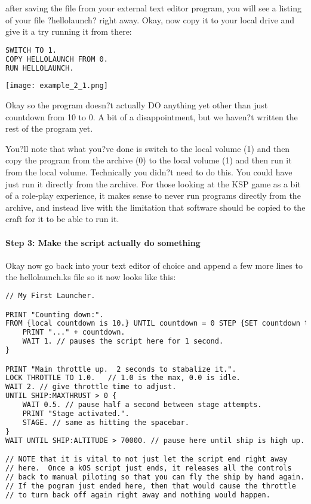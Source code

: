 after saving the file from your external text editor program, you will see a listing of your file ?hellolaunch? right away. Okay, now copy it to your local drive and give it a try running it from there:

\begin{lstlisting}[frame=single,language=XML]
SWITCH TO 1.
COPY HELLOLAUNCH FROM 0.
RUN HELLOLAUNCH.
\end{lstlisting} 

\begin{center}
\texttt{[image: example\_2\_1.png]}
\end{center}

Okay so the program doesn?t actually DO anything yet other than just countdown from 10 to 0. A bit of a disappointment, but we haven?t written the rest of the program yet.

You?ll note that what you?ve done is switch to the local volume (1) and then copy the program from the archive (0) to the local volume (1) and then run it from the local volume. Technically you didn?t need to do this. You could have just run it directly from the archive. For those looking at the KSP game as a bit of a role-play experience, it makes sense to never run programs directly from the archive, and instead live with the limitation that software should be copied to the craft for it to be able to run it.

\paragraph{Step 3: Make the script actually do something}
Okay now go back into your text editor of choice and append a few more lines to the hellolaunch.ks file so it now looks like this:

\begin{lstlisting}[frame=single,language=XML]
// My First Launcher.

PRINT "Counting down:".
FROM {local countdown is 10.} UNTIL countdown = 0 STEP {SET countdown to countdown - 1.} DO {
    PRINT "..." + countdown.
    WAIT 1. // pauses the script here for 1 second.
}

PRINT "Main throttle up.  2 seconds to stabalize it.".
LOCK THROTTLE TO 1.0.   // 1.0 is the max, 0.0 is idle.
WAIT 2. // give throttle time to adjust.
UNTIL SHIP:MAXTHRUST > 0 {
    WAIT 0.5. // pause half a second between stage attempts.
    PRINT "Stage activated.".
    STAGE. // same as hitting the spacebar.
}
WAIT UNTIL SHIP:ALTITUDE > 70000. // pause here until ship is high up.

// NOTE that it is vital to not just let the script end right away
// here.  Once a kOS script just ends, it releases all the controls
// back to manual piloting so that you can fly the ship by hand again.
// If the pogram just ended here, then that would cause the throttle
// to turn back off again right away and nothing would happen.
\end{lstlisting} 

